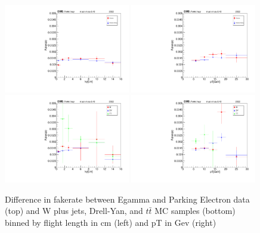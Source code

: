 \begin{figure}[!h]
  \begin{center}
    \includegraphics[width=0.49\textwidth]{figures/chapter4/fakerate/playV0-ks_kin_lxy_muidbdt40_EGamma_v_Parking_overlay.pdf}
    \includegraphics[width=0.49\textwidth]{figures/chapter4/fakerate/playV0-ks_kin_pT_muidbdt40_EGamma_v_Parking_overlay.pdf} \\
    \includegraphics[width=0.49\textwidth]{figures/chapter4/fakerate/playV0-ks_kin_lxy_muidbdt40_W_v_DY_v_TT_overlay.pdf}
    \includegraphics[width=0.49\textwidth]{figures/chapter4/fakerate/playV0-ks_kin_pT_muidbdt40_W_v_DY_v_TT_overlay.pdf}
  \end{center}
  \caption{Difference in fakerate between Egamma and Parking Electron data (top) and W plus jets, Drell-Yan, and $t\bar{t}$ MC samples (bottom) binned by flight length in cm (left) and pT in Gev (right)}
  \label{fig:pion_fake_rate_systematics}
\end{figure}

